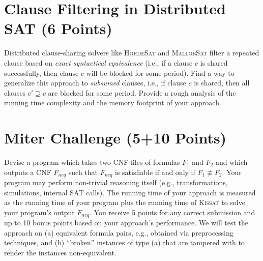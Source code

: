 \documentclass{article}
\begin{document}
\section{Clause Filtering in Distributed SAT (6 Points)}

Distributed clause-sharing solvers like \textsc{HordeSat} and \textsc{MallobSat} filter a repeated clause based on \textit{exact syntactical equivalence} (i.e., if a clause $c$ is shared successfully, then clause $c$ will be blocked for some period).
Find a way to generalize this approach to \textit{subsumed} clauses, i.e., if clause $c$ is shared, then all clauses $c' \supseteq c$ are blocked for some period.
Provide a rough analysis of the running time complexity and the memory footprint of your approach.

\section{Miter Challenge (5+10 Points)}

Devise a program which takes two CNF files of formulas $F_1$ and $F_2$ and which outputs a CNF $F_{neq}$ such that $F_{neq}$ is satisfiable if and only if $F_1 \not\equiv F_2$.
Your program may perform non-trivial reasoning itself (e.g., transformations, simulations, internal SAT calls).
The running time of your approach is measured as the running time of your program plus the running time of \textsc{Kissat} to solve your program's output $F_{neq}$.
You receive 5 points for any correct submission and up to 10 bonus points based on your approach's performance.
We will test the approach on (a) equivalent formula pairs, e.g., obtained via preprocessing techniques, and (b) ``broken'' instances of type (a) that are tampered with to render the instances non-equivalent.
\end{document}
